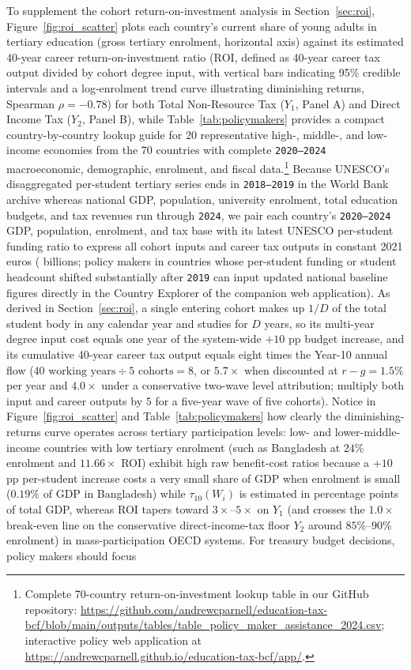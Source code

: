 \documentclass[11pt,a4paper]{article}
\begin{document}
To supplement the cohort return-on-investment analysis in Section~\ref{sec:roi}, Figure~\ref{fig:roi_scatter} plots each country's current share of young adults in tertiary education (gross tertiary enrolment, horizontal axis) against its estimated 40-year career return-on-investment ratio ($\text{ROI}$, defined as 40-year career tax output divided by cohort degree input, with vertical bars indicating 95\% credible intervals and a log-enrolment trend curve illustrating diminishing returns, Spearman $\rho = -0.78$) for both Total Non-Resource Tax ($Y_1$, Panel A) and Direct Income Tax ($Y_2$, Panel B), while Table~\ref{tab:policymakers} provides a compact country-by-country lookup guide for 20 representative high-, middle-, and low-income economies from the 70 countries with complete \texttt{2020--2024} macroeconomic, demographic, enrolment, and fiscal data.\footnote{\label{fn:policymakers}\raggedright Complete 70-country return-on-investment lookup table in our GitHub repository: \url{https://github.com/andrewcparnell/education-tax-bcf/blob/main/outputs/tables/table_policy_maker_assistance_2024.csv}; interactive policy web application at \url{https://andrewcparnell.github.io/education-tax-bcf/app/}.} Because UNESCO's disaggregated per-student tertiary series ends in \texttt{2018--2019} in the World Bank archive whereas national GDP, population, university enrolment, total education budgets, and tax revenues run through \texttt{2024}, we pair each country's \texttt{2020--2024} GDP, population, enrolment, and tax base with its latest UNESCO per-student funding ratio to express all cohort inputs and career tax outputs in constant 2021 euros (\texteuro{} billions; policy makers in countries whose per-student funding or student headcount shifted substantially after \texttt{2019} can input updated national baseline figures directly in the Country Explorer of the companion web application). As derived in Section~\ref{sec:roi}, a single entering cohort makes up $1/D$ of the total student body in any calendar year and studies for $D$ years, so its multi-year degree input cost equals one year of the system-wide $+10$ pp budget increase, and its cumulative 40-year career tax output equals eight times the Year-10 annual flow ($40 \text{ working years} \div 5 \text{ cohorts} = 8$, or $5.7\times$ when discounted at $r - g = 1.5\%$ per year and $4.0\times$ under a conservative two-wave level attribution; multiply both input and career outputs by $5$ for a five-year wave of five cohorts). Notice in Figure~\ref{fig:roi_scatter} and Table~\ref{tab:policymakers} how clearly the diminishing-returns curve operates across tertiary participation levels: low- and lower-middle-income countries with low tertiary enrolment (such as Bangladesh at $24\%$ enrolment and $11.66\times$ ROI) exhibit high raw benefit-cost ratios because a $+10$ pp per-student increase costs a very small share of GDP when enrolment is small ($0.19\%$ of GDP in Bangladesh) while $\tau_{10}(W_i)$ is estimated in percentage points of total GDP, whereas ROI tapers toward $3\times\text{--}5\times$ on $Y_1$ (and crosses the $1.0\times$ break-even line on the conservative direct-income-tax floor $Y_2$ around $85\%\text{--}90\%$ enrolment) in mass-participation OECD systems. For treasury budget decisions, policy makers should focus 
\end{document}
